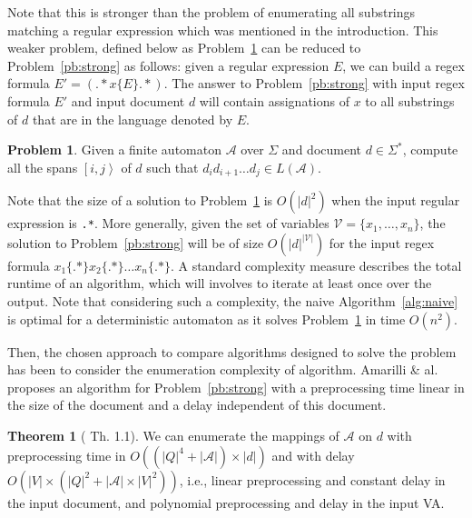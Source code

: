 \documentclass[11px]{article}
\theoremstyle{definition}
\newtheorem{problem}{Problem}
\newtheorem{theorem}{Theorem}
\newcommand{\Span}[1]{\left[ #1 \right\rangle}
\begin{document}
      Note that this is stronger than the problem of enumerating all substrings
      matching a regular expression which was mentioned in the introduction.
      This weaker problem, defined below as Problem~\ref{pb:weak} can be
      reduced to Problem~\ref{pb:strong} as follows: given a regular expression
      $E$, we can build a regex formula $E' = ({.}* x\{E\} {.}*)$. The answer
      to Problem~\ref{pb:strong} with input regex formula $E'$ and input
      document $d$ will contain assignations of $x$ to all substrings of $d$
      that are in the language denoted by $E$.

      \begin{problem}%
        \label{pb:weak}
        Given a finite automaton $\mathcal{A}$ over $\Sigma$ and document $d
        \in \Sigma^*$, compute all the spans $\Span{i, j}$ of $d$ such that
        $d_i d_{i+1} \ldots d_j \in L(\mathcal{A})$.
      \end{problem}

      Note that the size of a solution to Problem~\ref{pb:weak} is $O(|d|^2)$
      when the input regular expression is \texttt{.*}. More generally, given
      the set of variables $\mathcal{V} = \{x_1, \ldots, x_n\}$, the solution
      to Problem~\ref{pb:strong} will be of size $O(|d|^{|\mathcal{V}|})$ for
      the input regex formula \texttt{$x_1\{.*\} x_2\{.*\} \ldots x_n\{.*\}$}.
      A standard complexity measure describes the total runtime of an
      algorithm, which will involves to iterate at least once over the output.
      Note that considering such a complexity, the naive
      Algorithm~\ref{alg:naive} is optimal for a deterministic automaton as it
      solves Problem~\ref{pb:weak} in time $O(n^2)$.

      Then, the chosen approach to compare algorithms designed to solve the
      problem has been to consider the enumeration complexity of algorithm.
      Amarilli \& al.~\cite{ICDT19} proposes an algorithm for
      Problem~\ref{pb:strong} with a preprocessing time linear in the size of
      the document and a delay independent of this document.

      \begin{theorem}[\cite{ICDT19} Th. 1.1]%
        \label{th:master}
        We can enumerate the mappings of $\mathcal{A}$ on $d$ with
        preprocessing time in $O((|Q|^4 + |\mathcal{A}|) \times |d|)$ and with
        delay $O(|V| \times (|Q|^2 + |\mathcal{A}| \times |V|^2))$, i.e.,
        linear preprocessing and constant delay in the input document, and
        polynomial preprocessing and delay in the input VA.
      \end{theorem}
\end{document}
